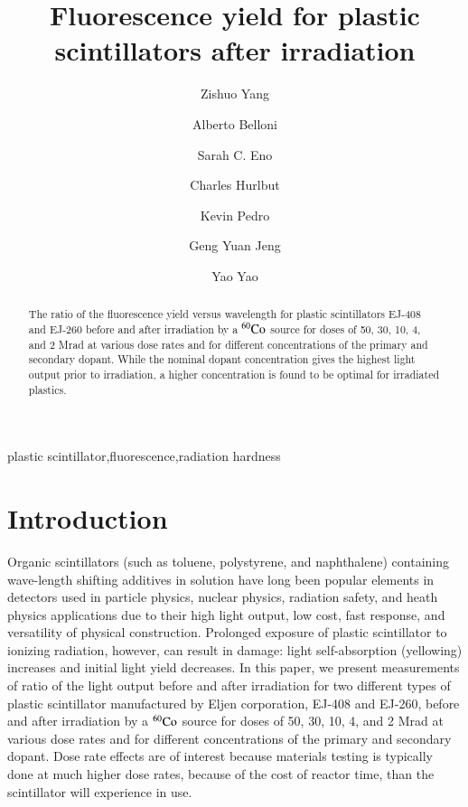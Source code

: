 \documentclass[review]{elsarticle}
\begin{document}
\begin{frontmatter}

\title{Fluorescence yield for plastic scintillators after irradiation }


\author[umd]{Zishuo Yang}
\author[umd]{Alberto Belloni}
\author[umd]{Sarah C. Eno}
\author[eljen]{Charles Hurlbut}
\author[umd]{Kevin Pedro}
\author[umd]{Geng Yuan Jeng}
\author[umd]{Yao Yao}




\address[umd]{Dept. Physics, U. Maryland, College Park MD 30742 USA}
\address[eljen]{Eljen Technology, 1300 W. Broadway, Sweetwater, Tx 79556 USA}


\begin{abstract}
The ratio of the fluorescence yield versus wavelength for plastic scintillators EJ-408 and EJ-260 before and after irradiation by a $\rm {^{60}Co}$ source for doses of 50, 30, 10, 4, and 2 Mrad at various dose rates and for different concentrations of the primary and secondary dopant.  While the nominal dopant concentration gives the highest light output prior to irradiation, a higher concentration is found to be optimal for irradiated plastics.
\end{abstract}

\begin{keyword}
plastic scintillator\sep fluorescence\sep radiation hardness
\end{keyword}

\end{frontmatter}

\linenumbers

\section{Introduction}
Organic scintillators (such as toluene, polystyrene, and naphthalene) containing wave-length shifting
additives in solution have long been popular elements in detectors used
in particle physics, nuclear physics, radiation safety, and heath physics applications  due to their high light output, low cost, fast response,
and versatility of physical construction. 
Prolonged exposure of plastic scintillator to
ionizing radiation, however, can result in damage:
light self-absorption (yellowing) increases and 
initial light yield decreases.  
In this paper, we present measurements of ratio of the light output before and after irradiation
for two different types of plastic scintillator manufactured by Eljen corporation, EJ-408 and EJ-260, before and after irradiation by a $\rm {^{60}Co}$ source for doses of 50, 30, 10, 4, and 2 Mrad at various dose rates and for different concentrations of the primary and secondary dopant.
Dose rate effects are of interest because materials testing is typically done at much higher dose rates, because of the cost of reactor time, than the scintillator will experience in use.
\end{document}
